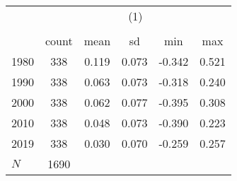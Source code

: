 {
\def\sym#1{\ifmmode^{#1}\else\(^{#1}\)\fi}
\begin{tabular}{l*{1}{ccccc}}
\toprule
            &\multicolumn{5}{c}{(1)}                                         \\
            &\multicolumn{5}{c}{}                                            \\
            &       count&        mean&          sd&         min&         max\\
\midrule
1980        &         338&       0.119&       0.073&      -0.342&       0.521\\
1990        &         338&       0.063&       0.073&      -0.318&       0.240\\
2000        &         338&       0.062&       0.077&      -0.395&       0.308\\
2010        &         338&       0.048&       0.073&      -0.390&       0.223\\
2019        &         338&       0.030&       0.070&      -0.259&       0.257\\
\midrule
\(N\)       &        1690&            &            &            &            \\
\bottomrule
\end{tabular}
}
